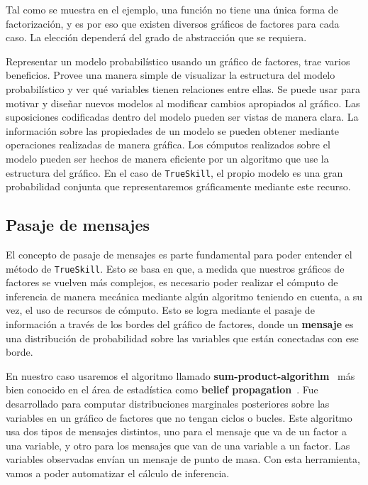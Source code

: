 \documentclass[11pt,twoside,spanish]{report} %
\begin{document}
Tal como se muestra en el ejemplo, una funci\'on no tiene una \'unica forma de factorizaci\'on, y es por eso que existen diversos gr\'aficos de factores para cada caso.
La elecci\'on depender\'a del grado de abstracci\'on que se requiera.

Representar un modelo probabil\'istico usando un gr\'afico de factores, trae varios beneficios.
Provee una manera simple de visualizar la estructura del modelo probabil\'istico y ver qu\'e variables tienen relaciones entre ellas.
Se puede usar para motivar y dise\~nar nuevos modelos al modificar cambios apropiados al gr\'afico.
Las suposiciones codificadas dentro del modelo pueden ser vistas de manera clara.
La informaci\'on sobre las propiedades de un modelo se pueden obtener mediante operaciones realizadas de manera gr\'afica.
Los c\'omputos realizados sobre el modelo pueden ser hechos de manera eficiente por un algoritmo que use la estructura del gr\'afico.
En el caso de \texttt{TrueSkill}, el propio modelo es una gran probabilidad conjunta que representaremos gr\'aficamente mediante este recurso.

\subsection{Pasaje de mensajes}\label{Sec:PasajeDeMensajes}

El concepto de pasaje de mensajes es parte fundamental para poder entender el m\'etodo de \texttt{TrueSkill}.
Esto se basa en que, a medida que nuestros gr\'aficos de factores se vuelven m\'as complejos, es necesario poder realizar el c\'omputo de inferencia de manera mec\'anica mediante alg\'un algoritmo teniendo en cuenta, a su vez, el uso de recursos de c\'omputo.
Esto se logra mediante el pasaje de informaci\'on a trav\'es de los bordes del gr\'afico de factores, donde un \textbf{mensaje} es una distribuci\'on de probabilidad sobre las variables que est\'an conectadas con ese borde.

En nuestro caso usaremos el algoritmo llamado \textbf{sum-product-algorithm}~\cite{Kschischang2001} m\'as bien conocido en el \'area de estad\'istica como \textbf{belief propagation}~\cite{Pearl1986}.
Fue desarrollado para computar distribuciones marginales posteriores sobre las variables en un gr\'afico de factores que no tengan ciclos o bucles.
Este algoritmo usa dos tipos de mensajes distintos, uno para el mensaje que va de un factor a una variable, y otro para los mensajes que van de una variable a un factor.
Las variables observadas env\'ian un mensaje de punto de masa.
Con esta herramienta, vamos a poder automatizar el c\'alculo de inferencia.
\end{document}
